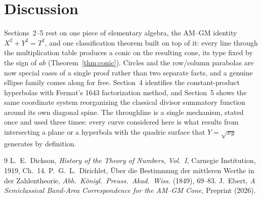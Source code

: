 \documentclass[11pt]{amsart}
\theoremstyle{remark}
\begin{document}
\section{Discussion}

Sections~2--5 rest on one piece of elementary algebra, the AM--GM identity $X^2+Y^2=T^2$, and one classification theorem built on top of it: every line through the multiplication table produces a conic on the resulting cone, its type fixed by the sign of $ab$ (Theorem~\ref{thm:conic}). Circles and the row/column parabolas are now special cases of a single proof rather than two separate facts, and a genuine ellipse family comes along for free. Section~4 identifies the constant-product hyperbolas with Fermat's 1643 factorization method, and Section~5 shows the same coordinate system reorganizing the classical divisor summatory function around its own diagonal spine. The throughline is a single mechanism, stated once and used three times: every curve considered here is what results from intersecting a plane or a hyperbola with the quadric surface that $Y=\sqrt{xy}$ generates by definition.

\begin{thebibliography}{9}
 L.~E.~Dickson, \emph{History of the Theory of Numbers, Vol.~I}, Carnegie Institution, 1919, Ch.~14.
 P.~G.~L.~Dirichlet, \"Uber die Bestimmung der mittleren Werthe in der Zahlentheorie, \emph{Abh.\ K\"onigl.\ Preuss.\ Akad.\ Wiss.} (1849), 69--83.
 J.~Ebert, \emph{A Semiclassical Band-Area Correspondence for the AM--GM Cone}, Preprint (2026).
\end{thebibliography}
\end{document}
